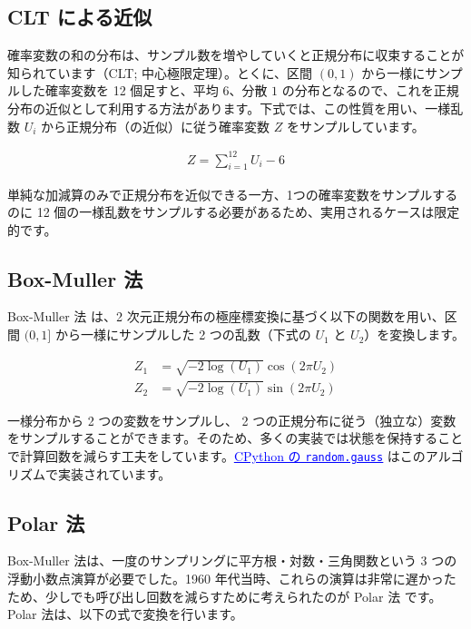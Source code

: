 \documentclass[twocolumn, dvipdfmx]{jsarticle}
\begin{document}
\subsection*{CLT による近似}

確率変数の和の分布は、サンプル数を増やしていくと正規分布に収束することが知られています（CLT; 中心極限定理）。とくに、区間 $(0, 1)$ から一様にサンプルした確率変数を 12 個足すと、平均 $6$、分散 $1$ の分布となるので、これを正規分布の近似として利用する方法があります。下式では、この性質を用い、一様乱数 $U_i$ から正規分布（の近似）に従う確率変数 $Z$ をサンプルしています。

\begin{align*}
    Z = \sum_{i=1}^{12} U_i - 6
\end{align*}

単純な加減算のみで正規分布を近似できる一方、1つの確率変数をサンプルするのに 12 個の一様乱数をサンプルする必要があるため、実用されるケースは限定的です。

\subsection*{Box-Muller 法}

Box-Muller 法 \cite{box1958note} は、2 次元正規分布の極座標変換に基づく以下の関数を用い、区間 $(0, 1]$ から一様にサンプルした 2 つの乱数（下式の $U_1$ と $U_2$）を変換します。

\begin{align*}
    Z_1 &= \sqrt{-2 \log (U_1)} \cos(2 \pi U_2) \\
    Z_2 &= \sqrt{-2 \log (U_1)} \sin(2 \pi U_2)
\end{align*}

一様分布から 2 つの変数をサンプルし、 2 つの正規分布に従う（独立な）変数をサンプルすることができます。そのため、多くの実装では状態を保持することで計算回数を減らす工夫をしています。\href{https://github.com/python/cpython/blob/b0dfc7581697f20385813582de7e92ba6ba0105f/Lib/random.py#L550-L586}{\textcolor{blue}{\underline{CPython の \texttt{random.gauss}}}} はこのアルゴリズムで実装されています。

\subsection*{Polar 法}

Box-Muller 法は、一度のサンプリングに平方根・対数・三角関数という 3 つの浮動小数点演算が必要でした。1960 年代当時、これらの演算は非常に遅かったため、少しでも呼び出し回数を減らすために考えられたのが Polar 法 \cite{marsaglia1964convinient} です。Polar 法は、以下の式で変換を行います。
\end{document}
